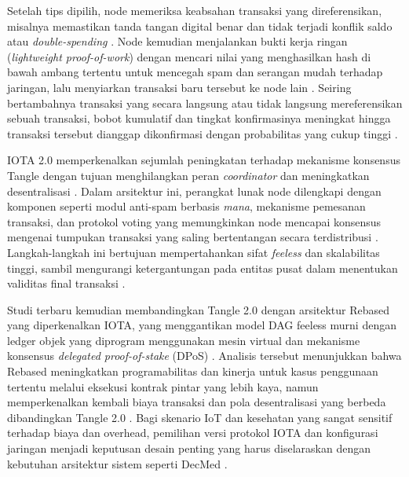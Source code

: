 Setelah tips dipilih, node memeriksa keabsahan transaksi yang direferensikan, misalnya memastikan tanda tangan digital benar dan tidak terjadi konflik saldo atau \emph{double-spending} \parencite{TheTangle_Popov_2017}. 
Node kemudian menjalankan bukti kerja ringan (\emph{lightweight proof-of-work}) dengan mencari nilai yang menghasilkan hash di bawah ambang tertentu untuk mencegah spam dan serangan mudah terhadap jaringan, lalu menyiarkan transaksi baru tersebut ke node lain \parencite{TheTangle_Popov_2017,IOTA_Tangle2_2022}. 
Seiring bertambahnya transaksi yang secara langsung atau tidak langsung mereferensikan sebuah transaksi, bobot kumulatif dan tingkat konfirmasinya meningkat hingga transaksi tersebut dianggap dikonfirmasi dengan probabilitas yang cukup tinggi \parencite{TheTangle_Popov_2017}. 

IOTA 2.0 memperkenalkan sejumlah peningkatan terhadap mekanisme konsensus Tangle dengan tujuan menghilangkan peran \emph{coordinator} dan meningkatkan desentralisasi \parencite{IOTA_Tangle2_2022}. 
Dalam arsitektur ini, perangkat lunak node dilengkapi dengan komponen seperti modul anti-spam berbasis \emph{mana}, mekanisme pemesanan transaksi, dan protokol voting yang memungkinkan node mencapai konsensus mengenai tumpukan transaksi yang saling bertentangan secara terdistribusi \parencite{IOTA_Tangle2_2022,FromTangleToRebased_2024}. 
Langkah-langkah ini bertujuan mempertahankan sifat \emph{feeless} dan skalabilitas tinggi, sambil mengurangi ketergantungan pada entitas pusat dalam menentukan validitas final transaksi \parencite{IOTA_Tangle2_2022}. 

Studi terbaru kemudian membandingkan Tangle 2.0 dengan arsitektur Rebased yang diperkenalkan IOTA, yang menggantikan model DAG feeless murni dengan ledger objek yang diprogram menggunakan mesin virtual dan mekanisme konsensus \emph{delegated proof-of-stake} (DPoS) \parencite{FromTangleToRebased_2024}. 
Analisis tersebut menunjukkan bahwa Rebased meningkatkan programabilitas dan kinerja untuk kasus penggunaan tertentu melalui eksekusi kontrak pintar yang lebih kaya, namun memperkenalkan kembali biaya transaksi dan pola desentralisasi yang berbeda dibandingkan Tangle 2.0 \parencite{FromTangleToRebased_2024}. 
Bagi skenario IoT dan kesehatan yang sangat sensitif terhadap biaya dan overhead, pemilihan versi protokol IOTA dan konfigurasi jaringan menjadi keputusan desain penting yang harus diselaraskan dengan kebutuhan arsitektur sistem seperti DecMed \parencite{Elevating_2025_iota_ehealth,FromTangleToRebased_2024}. 

